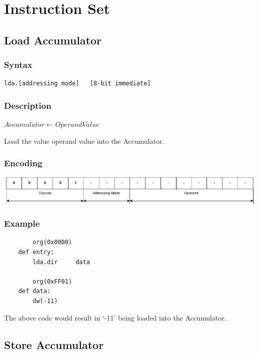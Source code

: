 \section{Instruction Set}\label{sec:instruction-set}
\pagebreak
\subsection{Load Accumulator}\label{subsec:lda}
    \subsubsection{Syntax}
    \begin{verbatim}lda.[addressing mode]   [8-bit immediate] \end{verbatim}
    \subsubsection{Description}
    $Accumulator \leftarrow OperandValue$
    \par Load the value operand value into the Accumulator.

    \subsubsection{Encoding}
    \begin{center}
        \includegraphics[scale=0.40]{img/Andromeda-LDA.drawio}
    \end{center}

    \subsubsection{Example}
    \begin{verbatim}
        org(0x0000)
    def entry:
        lda.dir     data

        org(0xFF01)
    def data:
        dw(-11)
    \end{verbatim}
    \par The above code would result in `-11' being loaded into the Accumulator.

\pagebreak
\subsection{Store Accumulator}\label{subsec:sta}
